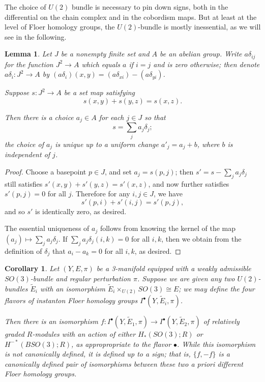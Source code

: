\documentclass{memo-l}
\newtheorem{lemma}[theorem]{Lemma}
\newtheorem{corollary}[theorem]{Corollary}
\theoremstyle{definition}
\theoremstyle{remark}
\numberwithin{section}{chapter}
\numberwithin{equation}{chapter}
\begin{document}
The choice of $U(2)$ bundle is necessary to pin down signs, both in the differential on the chain complex and in the cobordism maps. But at least at the level of Floer homology groups, the $U(2)$-bundle is mostly inessential, as we will see in the following.

\begin{lemma}\label{Cocycle}Let $J$ be a nonempty finite set and $A$ be an abelian group. Write $a\delta_{ij}$ for the function $J^2 \to A$ which equals $a$ if $i = j$ and is zero otherwise; then denote
$a \delta_i: J^2 \to A$ by $(a\delta_i)(x,y) = (a\delta_{xi}) - (a\delta_{yi})$.

Suppose $s: J^2 \to A$ be a set map satisfying $$s(x,y) + s(y,z) = s(x,z).$$ 

Then there is a choice $a_j \in A$ for each $j \in J$ so that $$s = \sum_j a_j \delta_j;$$ the choice of $a_j$ is unique up to a uniform change $a'_j = a_j + b$, where $b$ is independent of $j$. 
\end{lemma}
\begin{proof}Choose a basepoint $p \in J$, and set $a_j = s(p,j)$; then $s' = s - \sum_j a_j \delta_j$ still satisfies $s'(x,y) + s'(y,z) = s'(x,z)$, and now further satisfies $s'(p,j) = 0$ for all $j$. Therefore for any $i,j \in J$, we have $$s'(p,i) + s'(i,j) = s'(p,j),$$ and so $s'$ is identically zero, as desired.

The essential uniqueness of $a_j$ follows from knowing the kernel of the map $(a_j) \mapsto \sum_j a_j \delta_j$. If $\sum_j a_j \delta_j(i,k) = 0$ for all $i,k$, then we obtain from the definition of $\delta_j$ that $a_i - a_k = 0$ for all $i,k$, as desired.
\end{proof}

\begin{corollary}\label{no-u2}Let $(Y,E,\pi)$ be a 3-manifold equipped with a weakly admissible $SO(3)$-bundle and regular perturbation $\pi$. Suppose we are given any two $U(2)$-bundles $\tilde E_i$ with an isomorphism $\tilde E_i \times_{U(2)} SO(3) \cong E$; we may define the four flavors of instanton Floer homology groups $I^\bullet(Y,\tilde E_i,\pi)$. 

Then there is an isomorphism $f: I^\bullet(Y,\tilde E_1, \pi) \to I^\bullet(Y, \tilde E_2, \pi)$ of relatively graded $R$-modules with an action of either $H_*(SO(3);R)$ or $H^{-*}(BSO(3);R)$, as appropropriate to the flavor $\bullet$. While this isomorphism is not canonically defined, it is defined up to a sign; that is, $\{f, -f\}$ is a canonically defined pair of isomorphisms between these two a priori different Floer homology groups.
\end{corollary}
\end{document}

